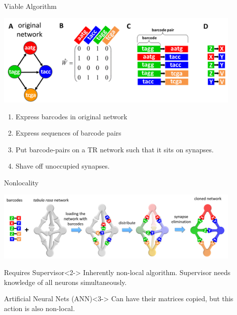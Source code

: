 \documentclass[10pt]{beamer}
\begin{document}
\begin{frame}{Viable Algorithm}
    \begin{center}
        \includegraphics[width=0.9\textwidth]{png/state_explain.png}
    \end{center}
    \begin{enumerate}
        \item Express barcodes in original network
        \item Express sequences of barcode pairs
        \item<2-> Put barcode-pairs on a TR network such that it sits on synapses.
        \item<3-> Shave off unoccupied synapses.
    \end{enumerate}
\end{frame}

\begin{frame}[fragile]{Nonlocality}
    \begin{center}
        \includegraphics[width=0.9\textwidth]{png/conn_nonlocal.png}
    \end{center}
    \begin{alertblock}{Requires Supervisor}<2->
        Inherently non-local algorithm.
        Supervisor needs knowledge of all neurons simultaneously.
    \end{alertblock}
    \begin{alertblock}{Artificial Neural Nets (ANN)}<3->
        Can have their matrices copied, but this action is also non-local.
    \end{alertblock}
\end{frame}
\end{document}

